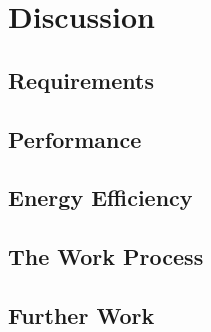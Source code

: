 \chapter{Discussion}

\section{Requirements}

\section{Performance}

\section{Energy Efficiency}

\section{The Work Process}

\section{Further Work}
